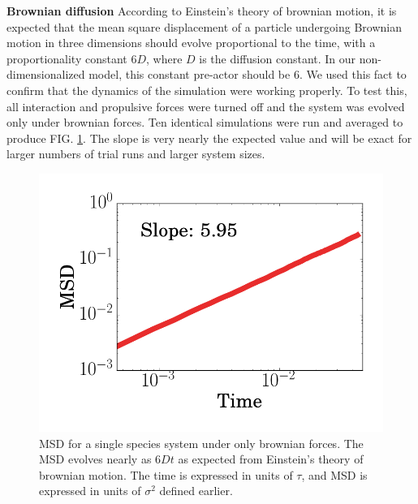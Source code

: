 \documentclass[aps,prb,twocolumn,groupedaddress,nofootinbib,floatfix]{revtex4}
\begin{document}
{\bf Brownian diffusion}
According to Einstein's theory of brownian motion, it is expected that the mean
square displacement of a particle undergoing Brownian motion in three dimensions should evolve proportional to the time, with a proportionality constant $6 D$, where $D$ is the diffusion constant. In our non-dimensionalized model, this constant pre-actor should be $6$. We used this fact to confirm that the dynamics of the simulation were working properly. To test this, all interaction and propulsive forces were turned off and the system was evolved only under brownian forces. Ten identical simulations were run and averaged to produce FIG. \ref{fig:brownianMSD}. The slope is very nearly the expected value and will be exact for larger numbers of trial runs and larger system sizes.
\begin{figure}
  \includegraphics[width=\columnwidth]{brownianMSD.png}
  \caption[brownianMSD]
    {MSD for a single species system under only brownian forces. The MSD evolves nearly as $6Dt$ as expected from Einstein's theory of brownian motion. The time is expressed in units of $\tau$, and MSD is expressed
    in units of $\sigma^2$ defined earlier.}
  \label{fig:brownianMSD}
\end{figure}
\end{document}
